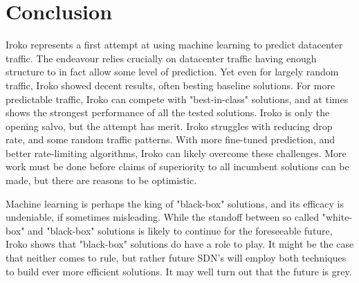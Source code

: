 \section{Conclusion}
\label{sec:conclusion}

Iroko represents a first attempt at using machine learning
to predict datacenter traffic. The endeavour relies crucially
on datacenter traffic having enough structure to in fact allow
some level of prediction. Yet even for largely random traffic,
Iroko showed decent results, often besting baseline solutions.
For more predictable traffic, Iroko can compete with "best-in-class"
solutions, and at times shows the strongest performance of all the
tested solutions.
Iroko is only the opening salvo, but the attempt has merit. Iroko
struggles with reducing drop rate, and some random traffic
patterns. With more fine-tuned
prediction, and better rate-limiting algorithms, Iroko can likely
overcome these challenges. 
More work must be done before claims of superiority to all
incumbent solutions can be made, but there are reasons to be
optimistic. 

Machine learning is perhaps the king of "black-box" solutions, 
and its efficacy is undeniable, if sometimes misleading. While
the standoff between so called "white-box" and "black-box" solutions is 
likely to continue for the foreseeable future, Iroko shows
that "black-box" solutions do have a role to play. It might be the case
that neither comes to rule, but rather future SDN's will 
employ both techniques to build ever more efficient solutions.
It may well turn out that the future is grey.



